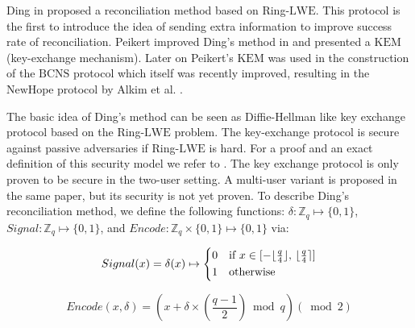 Ding in \cite{ding2012simple} proposed a reconciliation method based on Ring-$\mathrm{LWE}$. This protocol is the first to introduce the idea of sending extra information to improve success rate of reconciliation. Peikert improved Ding's method in \cite{peikert2014lattice} and presented a $\mathrm{KEM}$ (key-exchange mechanism). Later on Peikert's $\mathrm{KEM}$ was used in the construction of the $\mathrm{BCNS}$ protocol \cite{bos2015post} which itself was recently improved, resulting in the $\mathrm{NewHope}$ protocol by Alkim et al. \cite{alkim2015post}.

The basic idea of Ding's method can be seen as Diffie-Hellman like key exchange protocol based on the Ring-$\mathrm{LWE}$ problem. The key-exchange protocol is secure against passive adversaries if Ring-$\mathrm{LWE}$ is hard. For a proof and an exact definition of this security model we refer to \cite{ding2012simple}. The key exchange protocol is only proven to be secure in the two-user setting. A multi-user variant is proposed in the same paper, but its security is not yet proven. To describe Ding's reconciliation method, we define the following functions: $\delta: \mathbb{Z}_{q} \mapsto \{0, 1\}$, $Signal: \mathbb{Z}_{q} \mapsto \{0, 1\}$, and $Encode: \mathbb{Z}_{q} \times \{0, 1\} \mapsto \{0, 1\}$ via:

\begin{equation}
Signal(x) = \delta(x) \mapsto
\begin{cases*}
  0 & if $x \in [-\lfloor \frac{q}{4} \rfloor$, $\lfloor\frac{q}{4} \rceil]$\\
  1 & otherwise
\end{cases*}
\end{equation}



\begin{equation}
Encode(x, \delta) = (x + \delta \times (\frac{q-1}{2}) \bmod q) (\bmod 2)
\end{equation}





